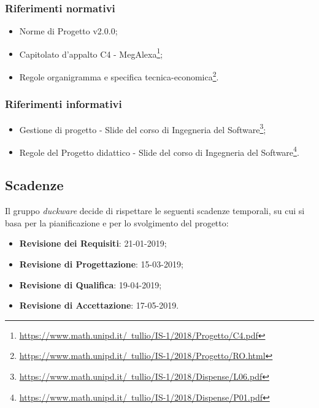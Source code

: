 \subsubsection{Riferimenti normativi}
\begin{itemize}
	\item Norme di Progetto v2.0.0;
	\item Capitolato d'appalto C4 - MegAlexa\footnote{\href{https://www.math.unipd.it/~tullio/IS-1/2018/Progetto/C4.pdf}{https://www.math.unipd.it/~tullio/IS-1/2018/Progetto/C4.pdf}};
	\item Regole organigramma e specifica tecnica-economica\footnote{\href{https://www.math.unipd.it/~tullio/IS-1/2018/Progetto/RO.html}{https://www.math.unipd.it/~tullio/IS-1/2018/Progetto/RO.html}}.
\end{itemize}
\subsubsection{Riferimenti informativi}
\begin{itemize}
	\item Gestione di progetto - Slide del corso di Ingegneria del Software\footnote{\href{https://www.math.unipd.it/~tullio/IS-1/2018/Dispense/L06.pdf}{https://www.math.unipd.it/~tullio/IS-1/2018/Dispense/L06.pdf}};
	\item Regole del Progetto didattico - Slide del corso di Ingegneria del Software\footnote{\href{https://www.math.unipd.it/~tullio/IS-1/2018/Dispense/P01.pdf}{https://www.math.unipd.it/~tullio/IS-1/2018/Dispense/P01.pdf}}.
\end{itemize}

\subsection{Scadenze}
Il gruppo \emph{duckware} decide di rispettare le seguenti scadenze temporali, su cui si basa per la pianificazione e per lo svolgimento del progetto:
\begin{itemize}
	\item \textbf{Revisione dei Requisiti}: 21-01-2019;
	\item \textbf{Revisione di Progettazione}: 15-03-2019;
	\item \textbf{Revisione di Qualifica}: 19-04-2019;
	\item \textbf{Revisione di Accettazione}: 17-05-2019.
\end{itemize}
